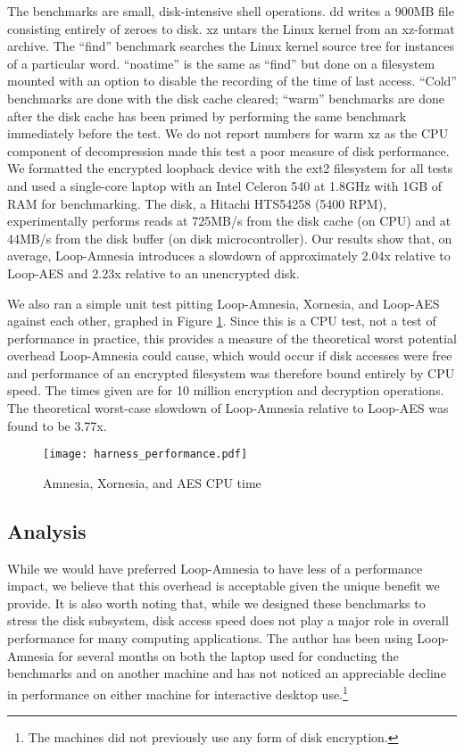 \documentclass[letterpaper,twocolumn,nonatbib,10pt]{article}
\begin{document}
The benchmarks are small, disk-intensive shell operations.  dd writes
a 900MB file consisting entirely of zeroes to disk.  xz untars the
Linux kernel from an xz-format archive.  The ``find'' benchmark
searches the Linux kernel source tree for instances of a particular
word. ``noatime'' is the same as ``find'' but done on a filesystem
mounted with an option to disable the recording of the time of last
access.  ``Cold'' benchmarks are done with the disk cache cleared;
``warm'' benchmarks are done after the disk cache has been primed by
performing the same benchmark immediately before the test.  We do not
report numbers for warm xz as the CPU component of decompression made
this test a poor measure of disk performance.  We formatted the
encrypted loopback device with the ext2 filesystem for all tests and
used a single-core laptop with an Intel Celeron 540 at 1.8GHz with 1GB
of RAM for benchmarking.  The disk, a Hitachi HTS54258 (5400 RPM),
experimentally performs reads at 725MB/s from the disk cache (on CPU)
and at 44MB/s from the disk buffer (on disk microcontroller).  Our
results show that, on average, Loop-Amnesia introduces a slowdown of
approximately 2.04x relative to Loop-AES and 2.23x relative to an
unencrypted disk.

We also ran a simple unit test pitting Loop-Amnesia, Xornesia, and
Loop-AES against each other, graphed in Figure \ref{fig:harness}.
Since this is a CPU test, not a test of performance in practice, this
provides a measure of the theoretical worst potential overhead
Loop-Amnesia could cause, which would occur if disk accesses were free
and performance of an encrypted filesystem was therefore bound
entirely by CPU speed.  The times given are for 10 million encryption
and decryption operations.  The theoretical worst-case slowdown of
Loop-Amnesia relative to Loop-AES was found to be 3.77x.

\begin{figure}[t]
\texttt{[image: harness\_performance.pdf]}
\caption{Amnesia, Xornesia, and AES CPU time}
\label{fig:harness}
\end{figure}

\subsection{Analysis}

While we would have preferred Loop-Amnesia to have less of a
performance impact, we believe that this overhead is acceptable given
the unique benefit we provide.  It is also worth noting that, while we
designed these benchmarks to stress the disk subsystem, disk access
speed does not play a major role in overall performance for many
computing applications.  The author has been using Loop-Amnesia for
several months on both the laptop used for conducting the benchmarks
and on another machine and has not noticed an appreciable decline in
performance on either machine for interactive desktop
use.\footnote{The machines did not previously use any form of disk
  encryption.}
\end{document}
